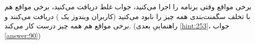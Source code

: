 \section{}
\paragraph{}\label{hint:314}
برخی مواقع وقتی برنامه را اجرا می‌کنید، جواب غلط دریافت می‌کنید، برخی مواقع هم با تخلف سگمنت‌بندی همه چیز را نابود می‌کنید (کاربران ویندوز یک  ) دریافت می‌کنند و برخی مواقع هم همه چیز درست کار می‌کند. (راهنماییِ بعدی \ref{hint:253}، جواب \ref{answer:90})